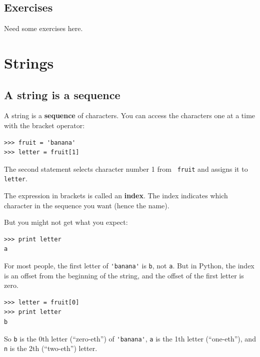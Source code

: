 \documentclass[10pt]{book}
\begin{document}
\section{Exercises}

\begin{ex}



Need some exercises here.

\end{ex}


\chapter{Strings}
\label{strings}


\section{A string is a sequence}

A string is a {\bf sequence} of characters.  
You can access the characters one at a time with the
bracket operator:

\beforeverb
\begin{verbatim}
>>> fruit = 'banana'
>>> letter = fruit[1]
\end{verbatim}
\afterverb
%
The second statement selects character number 1 from {\tt
fruit} and assigns it to {\tt letter}.  


The expression in brackets is called an {\bf index}.  
The index indicates which character in the sequence you
want (hence the name).

But you might not get what you expect:

\beforeverb
\begin{verbatim}
>>> print letter
a
\end{verbatim}
\afterverb
%
For most people, the first letter of \verb"'banana'" is {\tt b}, not
{\tt a}.  But in Python, the index is an offset from the
beginning of the string, and the offset of the first letter is zero.

\beforeverb
\begin{verbatim}
>>> letter = fruit[0]
>>> print letter
b
\end{verbatim}
\afterverb
%
So {\tt b} is the 0th letter (``zero-eth'') of \verb"'banana'", {\tt a}
is the 1th letter (``one-eth''), and {\tt n} is the 2th (``two-eth'')
letter.
\end{document}
